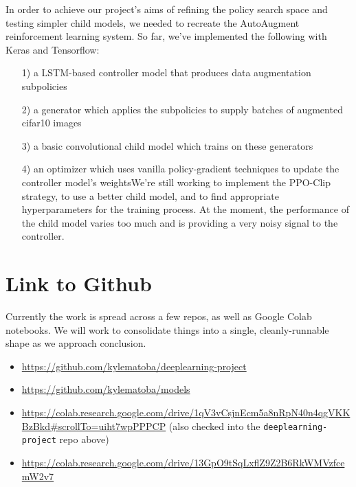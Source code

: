 \documentclass[10pt,twocolumn,letterpaper]{article}
\begin{document}
	In order to achieve our project's aims of refining the policy search space and testing simpler child models, we needed to recreate the AutoAugment reinforcement learning system. So far, we've implemented the following with Keras and Tensorflow:

	\begin{enumerate}
		\item[1)]
			a LSTM-based controller model that produces data augmentation subpolicies
		
		\item[2)]
			a generator which applies the subpolicies to supply batches of augmented cifar10 images
		
		\item[3)]
			a basic convolutional child model which trains on these generators
		
		\item[4)]
			an optimizer which uses vanilla policy-gradient techniques to update the controller model's weightsWe're still working to implement the PPO-Clip strategy, to use a better child model, and to find appropriate hyperparameters for the training process.    At the moment, the performance of the child model varies too much and is providing a very noisy signal to the controller.
			
	\end{enumerate}

\section{Link to Github}
	Currently the work is spread across a few repos, as well as Google Colab notebooks. We will work to consolidate things into a single, cleanly-runnable shape as we approach conclusion.

	\begin{itemize}
	\item \url{https://github.com/kylematoba/deeplearning-project}
	\item \url{https://github.com/kylematoba/models}
	\item \url{https://colab.research.google.com/drive/1qV3vCsjnEcm5a8nRpN40n4qgVKKBzBkd#scrollTo=uiht7wpPPPCP} (also checked into the \texttt{deeplearning-project} repo above)
	\item \url{https://colab.research.google.com/drive/13GpO9tSqLxflZ9Z2B6RkWMVzfcemW2v7}
	\end{itemize}


\nocite{Torralba2008}
{\small


}
\end{document}
